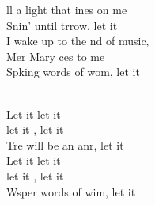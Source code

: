 \begin{cancion}
	ll a light that ines on me\\
	Snin' until trrow, let it  \\
	I wake up to the nd of music, \\
	Mer Mary ces to me\\
	Spking words of wom, let it  \\\jump\\
	\begin{chorus}%
	Let it  let it \\
	let it , let it \\
	Tre will be an anr, let it \\
\jump
	Let it  let it \\
	let it , let it \\
	Wsper words of wim, let it \\
	\end{chorus}%
	\jump\\
\end{cancion}%
